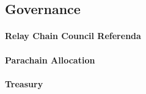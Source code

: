 \subsection{Governance}
 \paragraph{Relay Chain Council Referenda}
 \paragraph{Parachain Allocation}
 \paragraph{Treasury}
